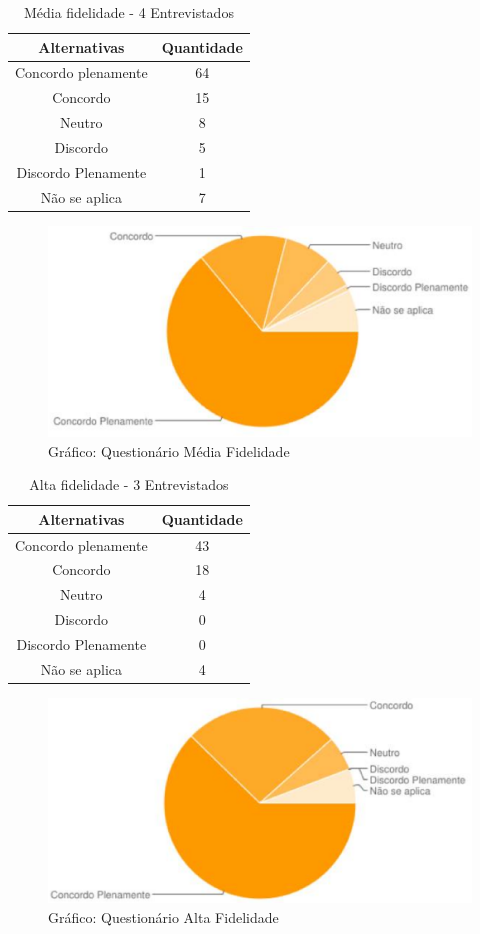 \begin{table}[H]
	\centering
	\begin{tabular}{|c|c|}
		\hline 
		\textbf{Alternativas} & \textbf{Quantidade}\tabularnewline
		\hline 
		\hline 
		Concordo plenamente & 64\tabularnewline
		\hline 
		Concordo & 15\tabularnewline
		\hline 
		Neutro & 8\tabularnewline
		\hline 
		Discordo & 5\tabularnewline
		\hline 
		Discordo Plenamente & 1\tabularnewline
		\hline 
		Não se aplica & 7\tabularnewline
		\hline 
	\end{tabular}
	\caption{Média fidelidade - 4 Entrevistados}
	\label{Metas_x_Questionario}
\end{table}

\begin{figure}[H]
	\begin{center}
		\includegraphics[keepaspectratio,scale=0.6]{figuras/grafico_questionario_media_fidelidade.eps}
		\caption{Gráfico: Questionário Média Fidelidade}
	\end{center}
\end{figure}

\begin{table}[H]
	\centering
	\begin{tabular}{|c|c|}
		\hline 
		\textbf{Alternativas} & \textbf{Quantidade}\tabularnewline
		\hline 
		\hline 
		Concordo plenamente & 43\tabularnewline
		\hline 
		Concordo & 18\tabularnewline
		\hline 
		Neutro & 4\tabularnewline
		\hline 
		Discordo & 0\tabularnewline
		\hline 
		Discordo Plenamente & 0\tabularnewline
		\hline 
		Não se aplica & 4\tabularnewline
		\hline 
	\end{tabular}
	\caption{Alta fidelidade - 3 Entrevistados}
	\label{Metas_x_Questionario}
\end{table}

\begin{figure}[H]
	\begin{center}
		\includegraphics[keepaspectratio,scale=0.6]{figuras/grafico_questionario_alta_fidelidade.eps}
		\caption{Gráfico: Questionário Alta Fidelidade}
	\end{center}
\end{figure}